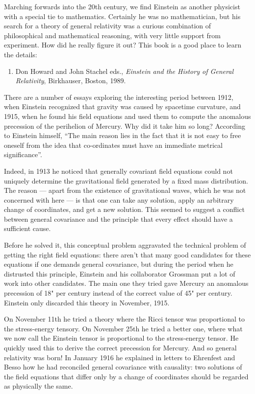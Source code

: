 \documentclass{article}
\def\tightlist{}
\begin{document}
Marching forwards into the 20th century, we find Einstein as another
physicist with a special tie to mathematics. Certainly he was no
mathematician, but his search for a theory of general relativity was a
curious combination of philosophical and mathematical reasoning, with
very little support from experiment. How did he really figure it out?
This book is a good place to learn the details:

\begin{enumerate}
\def\labelenumi{\arabic{enumi})}
\setcounter{enumi}{2}
\tightlist
\item
  Don Howard and John Stachel eds., \emph{Einstein and the History of
  General Relativity}, Birkhauser, Boston, 1989.
\end{enumerate}

There are a number of essays exploring the interesting period between
1912, when Einstein recognized that gravity was caused by spacetime
curvature, and 1915, when he found his field equations and used them to
compute the anomalous precession of the perihelion of Mercury. Why did
it take him so long? According to Einstein himself, ``The main reason
lies in the fact that it is not easy to free oneself from the idea that
co-ordinates must have an immediate metrical significance''.

Indeed, in 1913 he noticed that generally covariant field equations
could not uniquely determine the gravitational field generated by a
fixed mass distribution. The reason --- apart from the existence of
gravitational waves, which he was not concerned with here --- is that
one can take any solution, apply an arbitrary change of coordinates, and
get a new solution. This seemed to suggest a conflict between general
covariance and the principle that every effect should have a sufficient
cause.

Before he solved it, this conceptual problem aggravated the technical
problem of getting the right field equations: there aren't that many
good candidates for these equations if one demands general covariance,
but during the period when he distrusted this principle, Einstein and
his collaborator Grossman put a lot of work into other candidates. The
main one they tried gave Mercury an anomalous precession of 18" per
century instead of the correct value of 45" per century. Einstein only
discarded this theory in November, 1915.

On November 11th he tried a theory where the Ricci tensor was
proportional to the stress-energy tensory. On November 25th he tried a
better one, where what we now call the Einstein tensor is proportional
to the stress-energy tensor. He quickly used this to derive the correct
precession for Mercury. And so general relativity was born! In January
1916 he explained in letters to Ehrenfest and Besso how he had
reconciled general covariance with causality: two solutions of the field
equations that differ only by a change of coordinates should be regarded
as physically the same.
\end{document}
